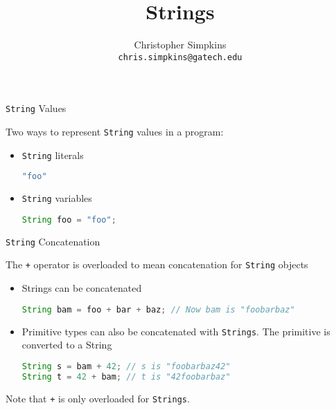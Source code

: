 \documentclass{beamer}
\title[CS 1331 Introduction to Object-Oriented Programming] %
{Strings}
\subtitle{}
\author[Chris Simpkins] %
{Christopher Simpkins \\\texttt{chris.simpkins@gatech.edu}}
\institute[Georgia Tech] %
\date[] %
{}
\begin{document}
\begin{frame}
  \titlepage
\end{frame}

\begin{frame}[fragile]{{\tt String} Values}


Two ways to represent {\tt String} values in a program:
\begin{itemize}

\item {\tt String} literals
\begin{lstlisting}[language=Java]
"foo"
\end{lstlisting}

\item {\tt String} variables

\begin{lstlisting}[language=Java]
String foo = "foo";
\end{lstlisting}

 
\end{itemize}
\end{frame}


\begin{frame}[fragile]{{\tt String} Concatenation }


The {\tt +} operator is overloaded to mean concatenation for {\tt String} objects

\begin{itemize}

\item Strings can be concatenated
\begin{lstlisting}[language=Java]
String bam = foo + bar + baz; // Now bam is "foobarbaz"
\end{lstlisting}

\item Primitive types can also be concatenated with {\tt Strings}.  The primitive is converted to a String
\begin{lstlisting}[language=Java]
String s = bam + 42; // s is "foobarbaz42"
String t = 42 + bam; // t is "42foobarbaz"
\end{lstlisting}

\end{itemize}

Note that {\tt +} is only overloaded for {\tt Strings}.

\end{frame}
\end{document}
